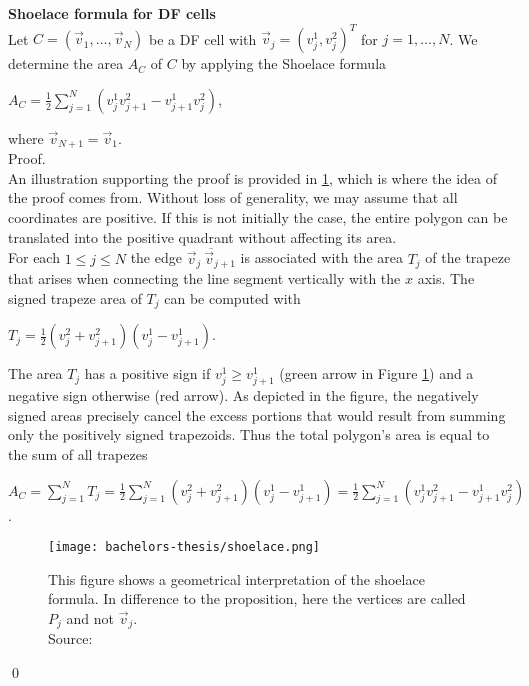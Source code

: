 \begin{proposition}  \textbf{Shoelace formula for DF cells} \label{prop:Shoelace}\\ 
	Let $C = (\vec{v}_1, \ldots, \vec{v}_N)$ be a DF cell with $\vec{v}_j = (v_j^1, v_j^2)^T$ for $j=1,\ldots,N$.
	We determine the area $A_C$ of $C$ by applying the Shoelace formula
	\begin{center}
		$A_C = \frac{1}{2}\sum\limits_{j = 1}^{N} (v_j^1 v_{j+1}^2 - v_{j+1}^1 v_j^2)$,
	\end{center} 
	where $\vec{v}_{N + 1} = \vec{v}_1$. \\
	Proof. 	\\
	An illustration supporting the proof is provided in \ref{fig:shoelace}, which is where the idea of the proof comes from. 
	Without loss of generality, we may assume that all coordinates are positive.
	If this is not initially the case, the entire polygon can be translated into the positive quadrant without affecting its area. \\
	For each $1 \leq j \leq N$ the edge $\overline{ \vec{v}_j \: \vec{v}_{j+1}}$ is associated with the area $T_j$ of the trapeze that arises when connecting the line segment vertically with the $x$ axis. 
	The signed trapeze area of $T_j$ can be computed with 
	\begin{center}
		$T_j = \frac{1}{2} (v_j^2 + v_{j+1}^2)(v_j^1 - v_{j+1}^1)$.
	\end{center}
	The area $T_j$ has a positive sign if $v_j^1 \geq v_{j+1}^1$ (green arrow in Figure \ref{fig:shoelace}) and a negative sign otherwise (red arrow). 
	As depicted in the figure, the negatively signed areas precisely cancel the excess portions that would result from summing only the positively signed trapezoids.
	Thus the total polygon's area is equal to the sum of all trapezes
	\begin{center}
		$A_C = \sum\limits_{j = 1}^{N} T_j = \frac{1}{2} \sum\limits_{j = 1}^{N} (v_j^2 + v_{j+1}^2)(v_j^1 - v_{j+1}^1) = \frac{1}{2}\sum\limits_{j = 1}^{N} (v_j^1 v_{j+1}^2 - v_{j+1}^1 v_j^2) $.
	\end{center} 
	\begin{figure}
		\begin{center}
			\texttt{[image: bachelors-thesis/shoelace.png]}
			\caption{
				This figure shows a geometrical interpretation of the shoelace formula. In difference to the proposition, here the vertices are called $P_j$ and not $\vec{v}_j$. \\
				Source: \cite{ShoelaceFigure2022}}
			\label{fig:shoelace}
		\end{center}
	\end{figure}
	\qed
\end{proposition}

